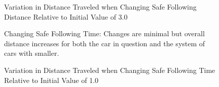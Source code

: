 \documentclass[12pt]{article}
\begin{document}
\begin{figure}[H]
  \centering
  \caption{Variation in Distance Traveled when Changing Safe Following Distance Relative to Initial Value of 3.0}
\end{figure}

\begin{figure}[H]
  \centering
  \caption{Changing Safe Following Time: Changes are minimal but overall distance increases for both the car in question and the system of cars with smaller.}
\end{figure}

\begin{figure}[H]
  \centering
  \caption{Variation in Distance Traveled when Changing Safe Following Time Relative to Initial Value of 1.0}
\end{figure}
\end{document}
